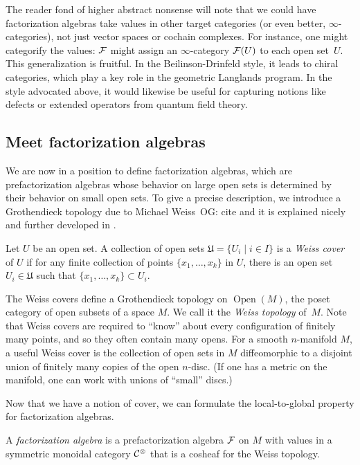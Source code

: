 \documentclass[11pt]{amsart}
\def\Open{\operatorname{Open}}
\def\owen#1{{\textcolor{violet!50!black}{OG: {#1}}}}
\begin{document}
\begin{rmk}
The reader fond of higher abstract nonsense will note that we could have factorization algebras take values in other target categories (or even better, $\infty$-categories),
not just vector spaces or cochain complexes.
For instance, one might categorify the values: 
$\mathcal F$ might assign an $\infty$-category $\mathcal F(U)$ to each open set~$U$.
This generalization is fruitful.
In the Beilinson-Drinfeld style, it leads to chiral categories, which play a key role in the geometric Langlands program.
In the style advocated above, it would likewise be useful for capturing notions like defects or extended operators from quantum field theory.
\end{rmk}

\subsection{Meet factorization algebras}

We are now in a position to define factorization algebras,
which are prefactorization algebras whose behavior on large open sets is determined by their behavior on small open sets.
To give a precise description, we introduce a Grothendieck topology due to Michael Weiss~\owen{cite  \cite{Weiss} and it is explained nicely and further developed in \cite{BoavidaWeiss}}.

\begin{dfn}
Let $U$ be an open set. A collection of open sets $\mathfrak{U} = \{ U_i \mid i \in I\}$ is a {\em Weiss cover} of $U$ if for any finite collection of points $\{x_1,\ldots,x_k\}$ in $U$, there is an open set $U_i \in \mathfrak{U}$ such that $\{x_1,\ldots,x_k\} \subset U_i$.
\end{dfn}

The Weiss covers define a Grothendieck topology on $\Open(M)$, the poset category of open subsets of a space $M$. 
We call it the {\em Weiss topology} of~$M$. 
Note that Weiss covers are required to ``know'' about every configuration of finitely many points,
and so they often contain many opens.
For a smooth $n$-manifold $M$, a useful Weiss cover is the collection of open sets in $M$ diffeomorphic to a disjoint union of finitely many copies of the open $n$-disc.
(If one has a metric on the manifold, one can work with unions of ``small'' discs.)

Now that we have a notion of cover, we can formulate the local-to-global property for factorization algebras.

\begin{dfn}
A \emph{factorization algebra} is a prefactorization algebra $\mathcal F$ on $M$ with values in a symmetric monoidal category $\mathcal C^\otimes$ that is a cosheaf for the Weiss topology.
\end{dfn}
\end{document}
